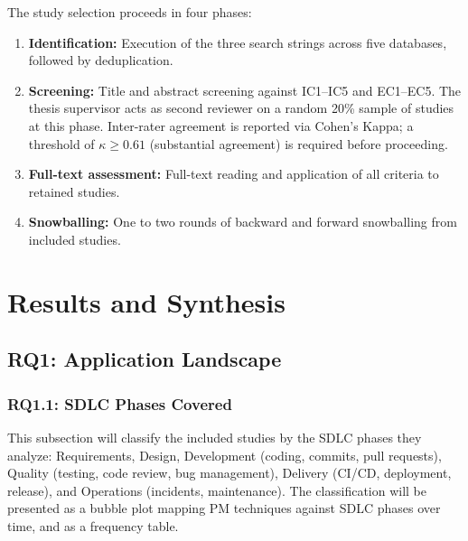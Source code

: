 The study selection proceeds in four phases:

\begin{enumerate}
\item \textbf{Identification:} Execution of the three search strings across five databases, followed by deduplication.
\item \textbf{Screening:} Title and abstract screening against IC1--IC5 and EC1--EC5. The thesis supervisor acts as second reviewer on a random 20\% sample of studies at this phase. Inter-rater agreement is reported via Cohen's Kappa; a threshold of $\kappa \geq 0.61$ (substantial agreement) is required before proceeding.
\item \textbf{Full-text assessment:} Full-text reading and application of all criteria to retained studies.
\item \textbf{Snowballing:} One to two rounds of backward and forward snowballing from included studies.
\end{enumerate}



\section{Results and Synthesis}
\label{sec:slr-synthesis}

\subsection{RQ1: Application Landscape}
\label{sec:slr-rq1}

\subsubsection{RQ1.1: SDLC Phases Covered}


This subsection will classify the included studies by the SDLC phases they analyze: Requirements, Design, Development (coding, commits, pull requests), Quality (testing, code review, bug management), Delivery (CI/CD, deployment, release), and Operations (incidents, maintenance). The classification will be presented as a bubble plot mapping PM techniques against SDLC phases over time, and as a frequency table.

